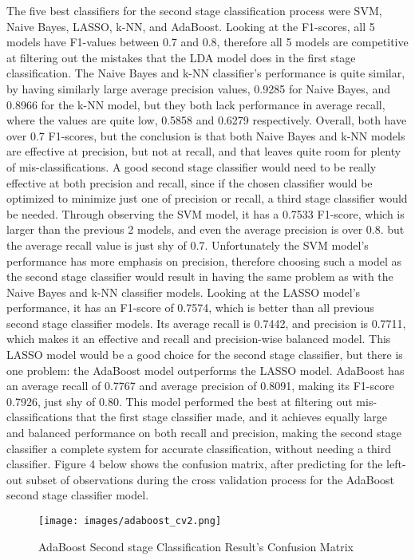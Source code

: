 \documentclass[11pt]{article}
\begin{document}
The five best classifiers for the second stage classification process were SVM, Naive Bayes, LASSO, k-NN, and AdaBoost. Looking at the F1-scores, all 5 models have F1-values between 0.7 and 0.8, therefore all 5 models are competitive at filtering out the mistakes that the LDA model does in the first stage classification. The Naive Bayes and k-NN classifier's performance is quite similar, by having similarly large average precision values, 0.9285 for Naive Bayes, and 0.8966 for the k-NN model, but they both lack performance in average recall, where the values are quite low, 0.5858 and 0.6279 respectively. Overall, both have over 0.7 F1-scores, but the conclusion is that both Naive Bayes and k-NN models are effective at precision, but not at recall, and that leaves quite room for plenty of mis-classifications. A good second stage classifier would need to be really effective at both precision and recall, since if the chosen classifier would be optimized to minimize just one of precision or recall, a third stage classifier would be needed. Through observing the SVM model, it has a 0.7533 F1-score, which is larger than the previous 2 models, and even the average precision is over 0.8. but the average recall value is just shy of 0.7. Unfortunately the SVM model's performance has more emphasis on precision, therefore choosing such a model as the second stage classifier would result in having the same problem as with the Naive Bayes and k-NN classifier models. Looking at the LASSO model's performance, it has an F1-score of 0.7574, which is better than all previous second stage classifier models. Its average recall is 0.7442, and precision is 0.7711, which makes it an effective and recall and precision-wise balanced model. This LASSO model would be a good choice for the second stage classifier, but there is one problem: the AdaBoost model outperforms the LASSO model. AdaBoost has an average recall of 0.7767 and average precision of 0.8091, making its F1-score 0.7926, just shy of 0.80. This model performed the best at filtering out mis-classifications that the first stage classifier made, and it achieves equally large and balanced performance on both recall and precision, making the second stage classifier a complete system for accurate classification, without needing a third classifier. Figure 4 below shows the confusion matrix, after predicting for the left-out subset of observations during the cross validation process for the AdaBoost second stage classifier model.

\begin{figure}[h!]
    \centering
    \texttt{[image: images/adaboost\_cv2.png]}
    \caption{AdaBoost Second stage Classification Result's Confusion Matrix}
    \label{fig:adaBoostCV}
\end{figure}
\end{document}
